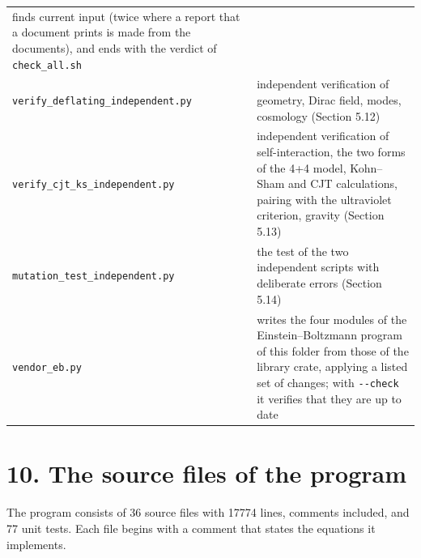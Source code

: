 \documentclass[
  10pt,
]{article}
\begin{document}
\begin{longtable}[]{@{}
  >{\raggedright\arraybackslash}p{}
  >{\raggedright\arraybackslash}p{}@{}}
finds current input (twice where a report that a document prints is made
from the documents), and ends with the verdict of
\texttt{check\_all.sh} \\
\texttt{verify\_deflating\_independent.py} & independent verification of
geometry, Dirac field, modes, cosmology (Section 5.12) \\
\texttt{verify\_cjt\_ks\_independent.py} & independent verification of
self-interaction, the two forms of the 4+4 model, Kohn--Sham and CJT
calculations, pairing with the ultraviolet criterion, gravity (Section
5.13) \\
\texttt{mutation\_test\_independent.py} & the test of the two
independent scripts with deliberate errors (Section 5.14) \\
\texttt{vendor\_eb.py} & writes the four modules of the
Einstein--Boltzmann program of this folder from those of the library
crate, applying a listed set of changes; with \texttt{-\/-check} it
verifies that they are up to date \\
\end{longtable}

\hypertarget{the-source-files-of-the-program}{%
\section{10. The source files of the
program}\label{the-source-files-of-the-program}}

The program consists of 36 source files with 17774 lines, comments
included, and 77 unit tests. Each file begins with a comment that states
the equations it implements.
\end{document}
